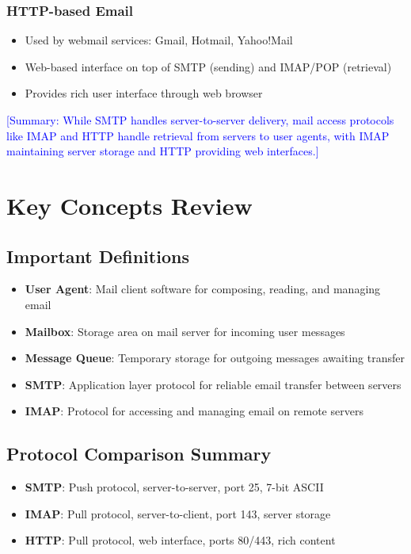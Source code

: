 \documentclass[12pt]{article}
\begin{document}
\subsubsection{HTTP-based Email}
\begin{itemize}
    \item Used by webmail services: Gmail, Hotmail, Yahoo!Mail
    \item Web-based interface on top of SMTP (sending) and IMAP/POP (retrieval)
    \item Provides rich user interface through web browser
\end{itemize}

\textcolor{blue}{[Summary: While SMTP handles server-to-server delivery, mail access protocols like IMAP and HTTP handle retrieval from servers to user agents, with IMAP maintaining server storage and HTTP providing web interfaces.]}

\section{Key Concepts Review}

\subsection{Important Definitions}
\begin{itemize}
    \item \textbf{User Agent}: Mail client software for composing, reading, and managing email
    \item \textbf{Mailbox}: Storage area on mail server for incoming user messages
    \item \textbf{Message Queue}: Temporary storage for outgoing messages awaiting transfer
    \item \textbf{SMTP}: Application layer protocol for reliable email transfer between servers
    \item \textbf{IMAP}: Protocol for accessing and managing email on remote servers
\end{itemize}

\subsection{Protocol Comparison Summary}
\begin{itemize}
    \item \textbf{SMTP}: Push protocol, server-to-server, port 25, 7-bit ASCII
    \item \textbf{IMAP}: Pull protocol, server-to-client, port 143, server storage
    \item \textbf{HTTP}: Pull protocol, web interface, ports 80/443, rich content
\end{itemize}
\end{document}
